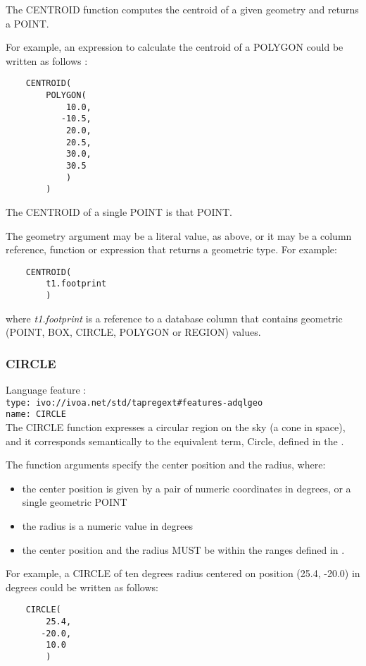 \documentclass[11pt,a4paper]{ivoa}
\begin{document}
The CENTROID function computes the centroid of a given geometry and returns a POINT.

For example, an expression to calculate the centroid of a POLYGON could
be written as follows :
\begin{verbatim}
    CENTROID(
        POLYGON(
            10.0,
           -10.5,
            20.0,
            20.5,
            30.0,
            30.5
            )
        )
\end{verbatim}

The CENTROID of a single POINT is that POINT.

The geometry argument may be a literal value, as above, or it may be a
column reference, function or expression that returns a geometric type.
For example:
\begin{verbatim}
    CENTROID(
        t1.footprint
        )
\end{verbatim}
where \textit{t1.footprint} is a reference to a database column that
contains geometric (POINT, BOX, CIRCLE, POLYGON or REGION) values.

\subsubsection{CIRCLE}
\label{sec:functions.geom.circle}
{\footnotesize Language feature :}\\
{\footnotesize \verb|type: ivo://ivoa.net/std/tapregext#features-adqlgeo|}\\
{\footnotesize \verb|name: CIRCLE|}\\

The CIRCLE function expresses a circular region on the sky (a cone in space),
and it corresponds semantically to the equivalent term, Circle, defined in
the \STCSpec{}.

The function arguments specify the center position and the radius, where:
\begin{itemize}
    \item the center position is given by a pair of numeric coordinates
    in degrees, or a single geometric POINT
    \item the radius is a numeric value in degrees
    \item the center position and the radius MUST be within the ranges defined in
    .
\end{itemize}

For example, a CIRCLE of ten degrees radius centered on position
(25.4, -20.0) in degrees could be written as follows:
\begin{verbatim}
    CIRCLE(
        25.4,
       -20.0,
        10.0
        )
\end{verbatim}
\end{document}
